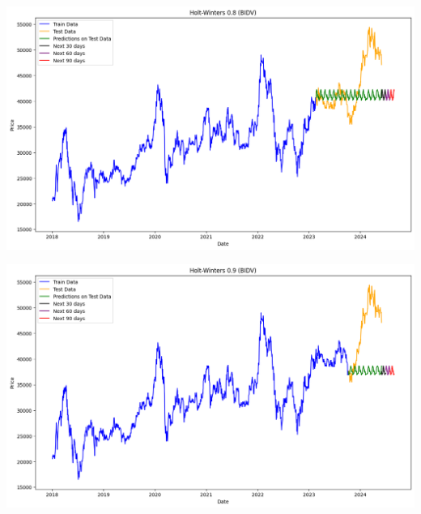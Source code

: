 \documentclass[conference]{IEEEtran}
\begin{document}
\begin{minipage}{0.21\textwidth}
    \centering
    \includegraphics[width=\linewidth]{images/Holt Winter/HW_BIDV_82.png}
    \label{fig:image1}
\end{minipage}
\hfill
\begin{minipage}{0.21\textwidth}
    \centering
    \includegraphics[width=\linewidth]{images/Holt Winter/HW_BIDV_91.png}
    \label{fig:image2}
\end{minipage}
\end{document}
